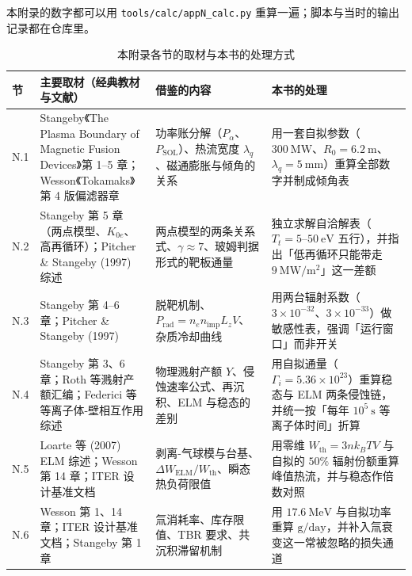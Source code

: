 \begingroup\small
本附录的数字都可以用 \texttt{tools/\allowbreak{}calc/\allowbreak{}appN\_calc.py} 重算一遍；脚本与当时的输出记录都在仓库里。

\begin{table}[htbp]
\centering
\small
\caption{本附录各节的取材与本书的处理方式}
\label{tab:app-n-source}
\begin{tabular}{@{}p{1.2cm}p{4.6cm}p{5.2cm}p{4.3cm}@{}}
\toprule
节 & 主要取材（经典教材与文献） & 借鉴的内容 & 本书的处理 \\
\midrule
N.1 & Stangeby《The Plasma Boundary of Magnetic Fusion Devices》第 1--5 章；Wesson《Tokamaks》第 4 版偏滤器章 & 功率账分解（$P_\alpha$、$P_{\mathrm{SOL}}$）、热流宽度 $\lambda_q$、磁通膨胀与倾角的关系 & 用一套自拟参数（$300\ \mathrm{MW}$、$R_0=6.2\ \mathrm{m}$、$\lambda_q=5\ \mathrm{mm}$）重算全部数字并制成倾角表 \\
N.2 & Stangeby 第 5 章（两点模型、$K_{0e}$、高再循环）；Pitcher \& Stangeby (1997) 综述 & 两点模型的两条关系式、$\gamma\approx7$、玻姆判据形式的靶板通量 & 独立求解自洽解表（$T_t=5$--$50\ \mathrm{eV}$ 五行），并指出「低再循环只能带走 $9\ \mathrm{MW/m^2}$」这一差额 \\
N.3 & Stangeby 第 4--6 章；Pitcher \& Stangeby (1997) & 脱靶机制、$P_{\mathrm{rad}}=n_en_{\mathrm{imp}}L_zV$、杂质冷却曲线 & 用两台辐射系数（$3\times10^{-32}$、$3\times10^{-33}$）做敏感性表，强调「运行窗口」而非开关 \\
N.4 & Stangeby 第 3、6 章；Roth 等溅射产额汇编；Federici 等等离子体-壁相互作用综述 & 物理溅射产额 $Y$、侵蚀速率公式、再沉积、ELM 与稳态的差别 & 用自拟通量（$\Gamma_i=5.36\times10^{23}$）重算稳态与 ELM 两条侵蚀链，并统一按「每年 $10^{5}\ \mathrm{s}$ 等离子体时间」折算 \\
N.5 & Loarte 等 (2007) ELM 综述；Wesson 第 14 章；ITER 设计基准文档 & 剥离-气球模与台基、$\Delta W_{\mathrm{ELM}}/W_{\mathrm{th}}$、瞬态热负荷限值 & 用零维 $W_{\mathrm{th}}=3nk_BTV$ 与自拟的 $50\%$ 辐射份额重算峰值热流，并与稳态作倍数对照 \\
N.6 & Wesson 第 1、14 章；ITER 设计基准文档；Stangeby 第 1 章 & 氚消耗率、库存限值、TBR 要求、共沉积滞留机制 & 用 $17.6\ \mathrm{MeV}$ 与自拟功率重算 $\mathrm{g/day}$，并补入氚衰变这一常被忽略的损失通道 \\
\bottomrule
\end{tabular}
\end{table}

